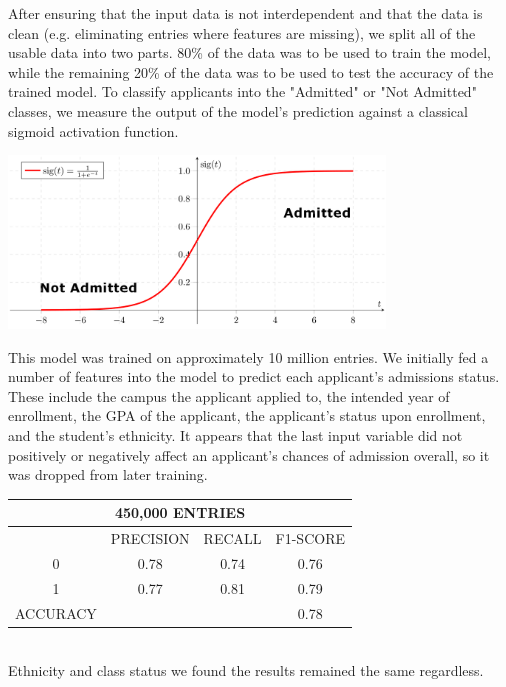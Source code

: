 \documentclass{article}
\begin{document}
After ensuring that the input data is not interdependent and that the data is clean (e.g. eliminating entries where features are missing), we split all of the usable data into two parts. 80\% of the data was to be used to train the model, while the remaining 20\% of the data was to be used to test the accuracy of the trained model. To classify applicants into the "Admitted" or "Not Admitted" classes, we measure the output of the model's prediction against a classical sigmoid activation function.
\begin{center}
  \includegraphics[width=100mm, scale=0.5]{images/Sigmoid.png} \newline
\end{center}
This model was trained on approximately 10 million entries. We initially fed a number of features into the model to predict each applicant's admissions status. These include the campus the applicant applied to, the intended year of enrollment, the GPA of the applicant, the applicant's status upon enrollment, and the student's ethnicity. It appears that the last input variable did not positively or negatively affect an applicant's chances of admission overall, so it was dropped from later training. \newline
\begin{center}
    \begin{tabular}{ |c|c|c|c| }
    \hline
    \multicolumn{4}{|c|}{450,000 ENTRIES} \\
    \hline
    \hline
    & PRECISION & RECALL & F1-SCORE \\
    \hline
    0 & 0.78 & 0.74 & 0.76 \\
    \hline
    1 & 0.77 & 0.81 & 0.79 \\
    \hline
    \hline
    ACCURACY & & & 0.78 \\
    \hline
    \end{tabular} \\
    Ethnicity and class status we found the results remained the same regardless.
\end{center}
\end{document}
